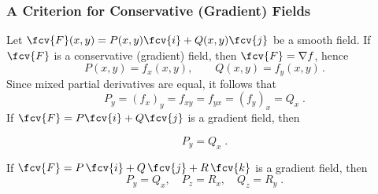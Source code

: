 \begin{frame}
\frametitle{A Criterion for Conservative (Gradient) Fields}

Let $\fcv{F}(x,y) = P(x,y) \fcv{i} + Q(x,y) \fcv{j}$ be a smooth field. If $\fcv{F}$ is a conservative (gradient) field, then $\fcv{F} = \nabla f$, hence
\[
P(x,y) = f_x(x,y), \qquad Q(x,y) = f_y(x,y)\, .
\]
\pause Since mixed partial derivatives are equal, it follows that
\[P_y = (f_x)_y = f_{xy} = f_{yx} = (f_y)_x = Q_x \; .
\]
%
\pause If $\fcv{F} = P \fcv{i} + Q \fcv{j}$ is a gradient field, then

\[P_y = Q_x \; .
\]

\pause 
\begin{proposition}
If $\fcv{F} = P\, \fcv{i} + Q\, \fcv{j}+ R\, \fcv{k}$ is a gradient field, then
\[P_y = Q_x, \quad P_z = R_x, \quad Q_z=R_y\; .
\]
\end{proposition}

\end{frame}